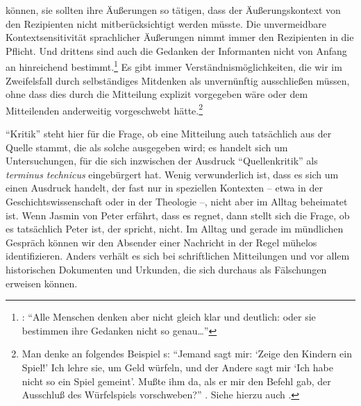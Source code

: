 können, sie sollten ihre Äußerungen so tätigen, dass der Äußerungskontext von
den Rezipienten nicht mitberücksichtigt werden müsste. Die unvermeidbare
Kontextsensitivität sprachlicher Äußerungen nimmt immer den Rezipienten in die
Pflicht. Und drittens sind auch die Gedanken der Informanten nicht von Anfang an
hinreichend
bestimmt.\footnote{\cite[Vgl.][\S~254]{Reimarus:DieVernunftlehrealseineAnweisungzumrichtigenGebrauchderVernunftinderErkenntnisderWahrheit1756}:
\enquote{Alle Menschen denken aber nicht gleich klar und deutlich: oder sie
bestimmen ihre Gedanken nicht so genau\dots}} Es gibt immer
Verständnismöglichkeiten, die wir im Zweifelsfall durch selbständiges Mitdenken
als unvernünftig ausschließen müssen, ohne dass dies durch die Mitteilung
explizit vorgegeben wäre oder dem Mitteilenden anderweitig
vorgeschwebt hätte.\footnote{Man denke an folgendes Beispiel
s: \enquote{Jemand sagt mir: \enquote{Zeige den
Kindern ein Spiel!} Ich lehre sie, um Geld würfeln, und der Andere sagt mir
\enquote{Ich habe nicht so ein Spiel gemeint}. Mußte ihm da, als er mir den
Befehl gab, der Ausschluß des Würfelspiels vorschweben?}
\parencite[][\S~70]{Wittgenstein:PhilosophischeUntersuchungen2003}. Siehe hierzu
auch \cite[][]{Kambartel:VersuchueberdasVerstehen1991}.}



\enquote{Kritik} steht hier für die Frage, ob eine Mitteilung auch tatsächlich
aus der Quelle stammt, die als solche ausgegeben wird; es handelt sich um
Untersuchungen, für die sich inzwischen der Ausdruck \enquote{Quellenkritik}
als \emph{terminus technicus} eingebürgert hat. Wenig verwunderlich ist, dass es sich
um einen Ausdruck handelt, der fast nur in speziellen Kontexten -- etwa in der
Geschichtswissenschaft oder in der Theologie --, nicht aber im Alltag beheimatet
ist. Wenn Jasmin von Peter erfährt, dass es regnet, dann stellt sich die Frage,
ob es tatsächlich Peter ist, der spricht, nicht. Im Alltag und gerade im mündlichen Gespräch können wir den
Absender einer Nachricht in der Regel mühelos identifizieren. Anders verhält es sich bei schriftlichen Mitteilungen und vor
allem historischen Dokumenten und Urkunden, die sich durchaus als Fälschungen
erweisen können.


